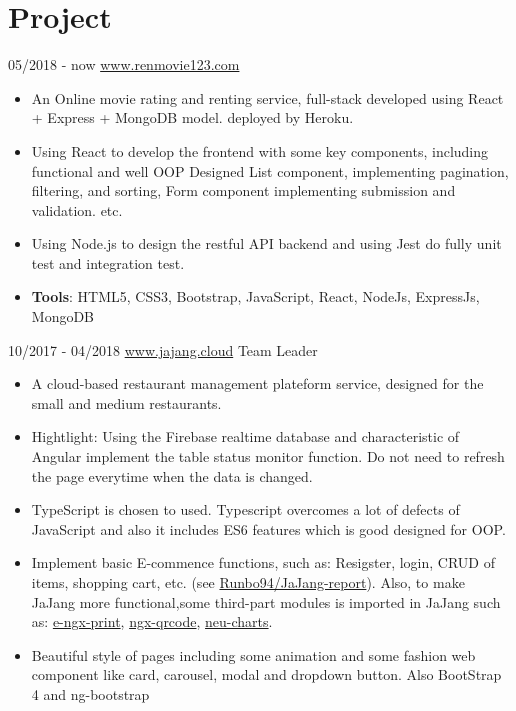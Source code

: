 \documentclass[letterpaper]{twentysecondcv} %
\begin{document}
\section{Project}
\begin{twenty}
	\twentyitem
	{05/2018}
	{- now}
	{\href{www.renmovie123.com}{www.renmovie123.com}}
	{}
	{}
	{
		{\begin{itemize}
				\item An Online movie rating and renting service, full-stack developed using React + Express + MongoDB model.
				deployed by Heroku.
				\item Using React to develop the frontend with some key components, including functional and well OOP Designed List component, implementing pagination, filtering, and sorting, Form component implementing submission and validation. etc.
				\item Using Node.js to design the restful API backend and using Jest do fully unit test and integration test.
				\item \textbf{Tools}: HTML5, CSS3, Bootstrap, JavaScript, React, NodeJs, ExpressJs, MongoDB  \vspace{2mm}
		\end{itemize}}
	}
	\twentyitem
	{10/2017}
	{- 04/2018}
	{\href{www.jajang.cloud}{www.jajang.cloud}}
	{}
	{Team Leader}
	{
		{\begin{itemize}
				\item A cloud-based restaurant management plateform service, designed for the small and medium restaurants.
				\item Hightlight: Using the Firebase realtime database and characteristic of Angular implement the table status monitor function. Do not need to refresh the page everytime when the data is changed. 
				\item TypeScript is chosen to used. Typescript overcomes a lot of defects of JavaScript and also it includes ES6 features which is good designed for OOP. 
				\item Implement basic E-commence functions, such as: Resigster, login, CRUD of items, shopping cart, etc. (see \href{https://github.com/Runbo94/JaJang-report}{Runbo94/JaJang-report}). Also, to make JaJang more functional,some third-part modules is imported in JaJang such as: \href{https://github.com/laixiangran/e-ngx-print}{e-ngx-print}, \href{https://github.com/nacardin/ngx-qrcode}{ngx-qrcode}, 
				\href{https://www.npmjs.com/package/neu-charts}{neu-charts}.
				\item Beautiful style of pages including some animation and some fashion web component like card, carousel, modal and dropdown button. Also BootStrap 4 and ng-bootstrap

\end{itemize}}}
\end{twenty}
\end{document}

